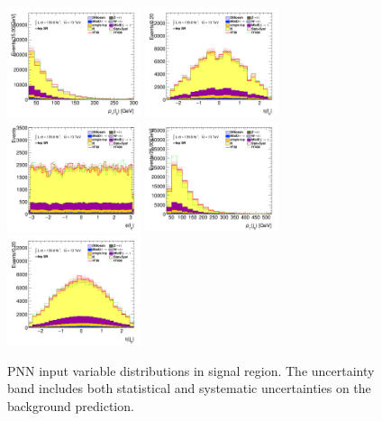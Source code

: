 		\begin{figure}[!htp]
			\begin{center}    
			\includegraphics[width=0.35\textwidth]{chapters/chapter6_HPlus/images/taulep/lep_0_pt_SR_TAULEP.png}
			\includegraphics[width=0.35\textwidth]{chapters/chapter6_HPlus/images/taulep/lep_0_eta_SR_TAULEP.png} \\
			\includegraphics[width=0.35\textwidth]{chapters/chapter6_HPlus/images/taulep/lep_0_phi_SR_TAULEP.png}
			\includegraphics[width=0.35\textwidth]{chapters/chapter6_HPlus/images/taulep/jet_0_pt_SR_TAULEP.png} \\
			\includegraphics[width=0.35\textwidth]{chapters/chapter6_HPlus/images/taulep/jet_0_eta_SR_TAULEP.png} 
			\end{center}
			\caption{
			PNN input variable distributions in \taulep signal region. The uncertainty band includes both statistical and systematic uncertainties on the background prediction. 
			}
			\label{fig:sr-taulep-3}
		\end{figure}

